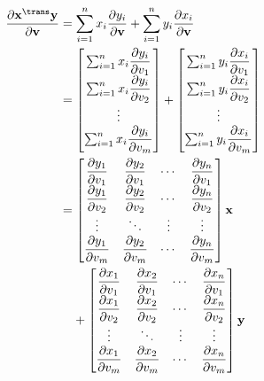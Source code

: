 \begin{align}
    \dfrac{\partial \mathbf{x}^\trans \mathbf{y}}{\partial \mathbf{v}} & = \sum_{i=1}^{n} x_i\dfrac{\partial y_i}{\partial \mathbf{v}} + \sum_{i=1}^{n} y_i\dfrac{\partial x_i}{\partial \mathbf{v}} \\
    & = \begin{bmatrix}
        \sum_{i=1}^{n} x_i\dfrac{\partial y_i}{\partial v_1} \\
        \sum_{i=1}^{n} x_i\dfrac{\partial y_i}{\partial v_2} \\
        \vdots \\
        \sum_{i=1}^{n} x_i\dfrac{\partial y_i}{\partial v_m} \\
    \end{bmatrix} +
    \begin{bmatrix}
        \sum_{i=1}^{n} y_i\dfrac{\partial x_i}{\partial v_1} \\
        \sum_{i=1}^{n} y_i\dfrac{\partial x_i}{\partial v_2} \\
        \vdots \\
        \sum_{i=1}^{n} y_i\dfrac{\partial x_i}{\partial v_m}
    \end{bmatrix} \\
    & = \begin{bmatrix}
        \dfrac{\partial y_1}{\partial v_1} & \dfrac{\partial y_2}{\partial v_1} & \cdots & \dfrac{\partial y_n}{\partial v_1} \\
        \dfrac{\partial y_1}{\partial v_2} & \dfrac{\partial y_2}{\partial v_2} & \cdots & \dfrac{\partial y_n}{\partial v_2} \\
        \vdots & \ddots & \vdots & \vdots \\
        \dfrac{\partial y_1}{\partial v_m} & \dfrac{\partial y_2}{\partial v_m} & \cdots & \dfrac{\partial y_n}{\partial v_m} \\
    \end{bmatrix} \mathbf{x} \\
    & \hspace{2.5ex} + \begin{bmatrix}
        \dfrac{\partial x_1}{\partial v_1} & \dfrac{\partial x_2}{\partial v_1} & \cdots & \dfrac{\partial x_n}{\partial v_1} \\
        \dfrac{\partial x_1}{\partial v_2} & \dfrac{\partial x_2}{\partial v_2} & \cdots & \dfrac{\partial x_n}{\partial v_2} \\
        \vdots & \ddots & \vdots & \vdots \\
        \dfrac{\partial x_1}{\partial v_m} & \dfrac{\partial x_2}{\partial v_m} & \cdots & \dfrac{\partial x_n}{\partial v_m} \\
    \end{bmatrix} \mathbf{y}
\end{align}
